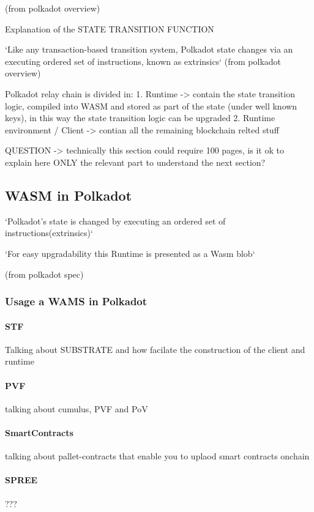 \documentclass[../main.tex]{subfiles}
\begin{document}
(from polkadot overview)

Explanation of the STATE TRANSITION FUNCTION

`Like any transaction-based transition system, Polkadot state changes via an executing ordered set of instructions, known as extrinsics`
(from polkadot overview)

Polkadot relay chain is divided in:
    1. Runtime -> contain the state transition logic, compiled into WASM and stored as part of the state (under well known keys), in this way the state transition logic can be upgraded
    2. Runtime environment / Client -> contian all the remaining blockchain relted stuff

QUESTION -> technically this section could require 100 pages, is it ok to explain here ONLY the relevant part to understand the next section?

\subsection{WASM in Polkadot}

`Polkadot’s state is changed by executing an ordered set of instructions(extrinsics)`

`For easy upgradability this Runtime is presented as a Wasm blob`

(from polkadot spec)

\subsubsection{Usage a WAMS in Polkadot}
\paragraph{STF}

Talking about SUBSTRATE and how facilate the construction of the client and runtime

\paragraph{PVF}

talking about cumulus, PVF and PoV
\paragraph{SmartContracts}

talking about pallet-contracts that enable you to uplaod smart contracts onchain

\paragraph{SPREE}

???
\end{document}
